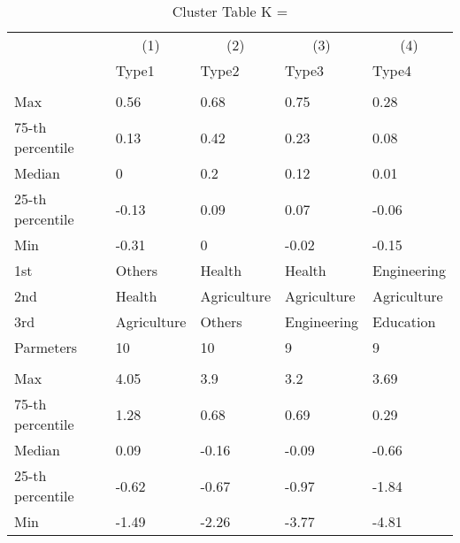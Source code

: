 \begin{table}
\centering
\caption{Cluster Table K = }
\centering
\begin{threeparttable}
\begin{tabular}[t]{lllll}
\toprule
\multicolumn{1}{c}{ } & \multicolumn{1}{c}{(1)} & \multicolumn{1}{c}{(2)} & \multicolumn{1}{c}{(3)} & \multicolumn{1}{c}{(4)} \\
\cmidrule(l{3pt}r{3pt}){2-2} \cmidrule(l{3pt}r{3pt}){3-3} \cmidrule(l{3pt}r{3pt}){4-4} \cmidrule(l{3pt}r{3pt}){5-5}
 & Type1 & Type2 & Type3 & Type4\\
\midrule
\addlinespace[0.3em]
\multicolumn{5}{l}{\textit{\textbf{Panel A: }}}\\
\hspace{1em}Max & 0.56 & 0.68 & 0.75 & 0.28\\
\hspace{1em}75-th percentile & 0.13 & 0.42 & 0.23 & 0.08\\
\hspace{1em}Median & 0 & 0.2 & 0.12 & 0.01\\
\hspace{1em}25-th percentile & -0.13 & 0.09 & 0.07 & -0.06\\
\hspace{1em}Min & -0.31 & 0 & -0.02 & -0.15\\
\hspace{1em}1st & Others & Health & Health & Engineering\\
\hspace{1em}2nd & Health & Agriculture & Agriculture & Agriculture\\
\hspace{1em}3rd & Agriculture & Others & Engineering & Education\\
\hspace{1em}Parmeters & 10 & 10 & 9 & 9\\
\addlinespace[0.3em]
\multicolumn{5}{l}{\textit{\textbf{Panel B: }}}\\
\hspace{1em}Max & 4.05 & 3.9 & 3.2 & 3.69\\
\hspace{1em}75-th percentile & 1.28 & 0.68 & 0.69 & 0.29\\
\hspace{1em}Median & 0.09 & -0.16 & -0.09 & -0.66\\
\hspace{1em}25-th percentile & -0.62 & -0.67 & -0.97 & -1.84\\
\hspace{1em}Min & -1.49 & -2.26 & -3.77 & -4.81\\

\end{tabular}
\end{threeparttable}
\end{table}

